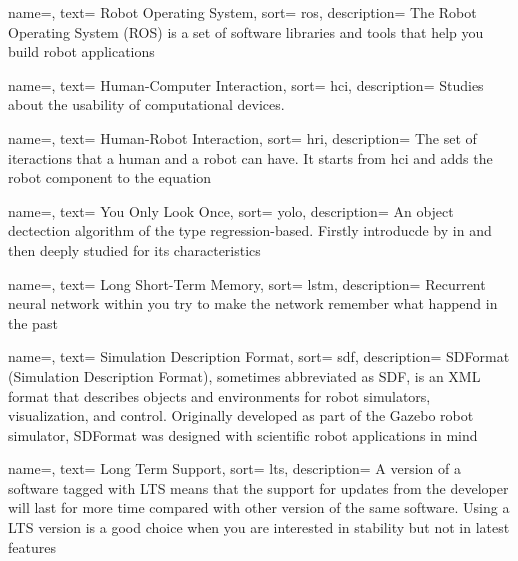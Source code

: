 {
  name=,
  text= Robot Operating System,
  sort= ros,
  description= {The Robot Operating System (ROS) is a set of software libraries and tools that help you build robot applications~\cite{site:ros}}
}

{
  name=,
  text= Human-Computer Interaction,
  sort= hci,
  description= {Studies about the usability of computational devices.}
}

{
  name=,
  text= Human-Robot Interaction,
  sort= hri,
  description= {The set of iteractions that a human and a robot can have. It starts from \gls{hci} and adds the robot component to the equation}
}

{
  name=,
  text= You Only Look Once,
  sort= yolo,
  description= {An object dectection algorithm of the type regression-based. Firstly introducde by \citeauthor{article:yolov1}\cite{article:yolov1} in \citeyear{article:yolov1} and then deeply studied for its characteristics}
}

{
  name=,
  text= Long Short-Term Memory,
  sort= lstm,
  description= {Recurrent neural network within you try to make the network remember what happend in the past}
}


{
  name=,
  text= Simulation Description Format,
  sort= sdf,
  description= {SDFormat (Simulation Description Format), sometimes abbreviated as SDF, is an XML format that describes objects and environments for robot simulators, visualization, and control. Originally developed as part of the Gazebo robot simulator, SDFormat was designed with scientific robot applications in mind}
}


{
  name=,
  text= Long Term Support,
  sort= lts,
  description= {A version of a software tagged with LTS means that the support for updates from the developer will last for more time compared with other version of the same software. Using a LTS version is a good choice when you are interested in stability but not in latest features}
}



